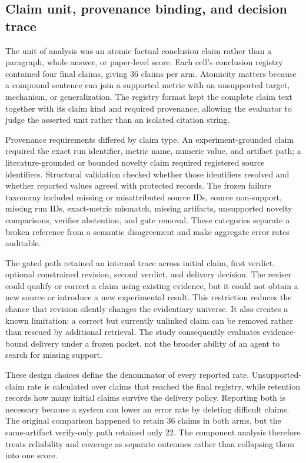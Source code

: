 \documentclass[11pt]{article}
\begin{document}
\subsection{Claim unit, provenance binding, and decision trace}

The unit of analysis was an atomic factual conclusion claim rather than a paragraph, whole answer, or paper-level score. Each cell's conclusion registry contained four final claims, giving 36 claims per arm. Atomicity matters because a compound sentence can join a supported metric with an unsupported target, mechanism, or generalization. The registry format kept the complete claim text together with its claim kind and required provenance, allowing the evaluator to judge the asserted unit rather than an isolated citation string.

Provenance requirements differed by claim type. An experiment-grounded claim required the exact run identifier, metric name, numeric value, and artifact path; a literature-grounded or bounded novelty claim required registered source identifiers. Structural validation checked whether those identifiers resolved and whether reported values agreed with protected records. The frozen failure taxonomy included missing or misattributed source IDs, source non-support, missing run IDs, exact-metric mismatch, missing artifacts, unsupported novelty comparisons, verifier abstention, and gate removal. These categories separate a broken reference from a semantic disagreement and make aggregate error rates auditable.

The gated path retained an internal trace across initial claim, first verdict, optional constrained revision, second verdict, and delivery decision. The reviser could qualify or correct a claim using existing evidence, but it could not obtain a new source or introduce a new experimental result. This restriction reduces the chance that revision silently changes the evidentiary universe. It also creates a known limitation: a correct but currently unlinked claim can be removed rather than rescued by additional retrieval. The study consequently evaluates evidence-bound delivery under a frozen packet, not the broader ability of an agent to search for missing support.

These design choices define the denominator of every reported rate. Unsupported-claim rate is calculated over claims that reached the final registry, while retention records how many initial claims survive the delivery policy. Reporting both is necessary because a system can lower an error rate by deleting difficult claims. The original comparison happened to retain 36 claims in both arms, but the same-artifact verify-only path retained only 22. The component analysis therefore treats reliability and coverage as separate outcomes rather than collapsing them into one score.
\end{document}
